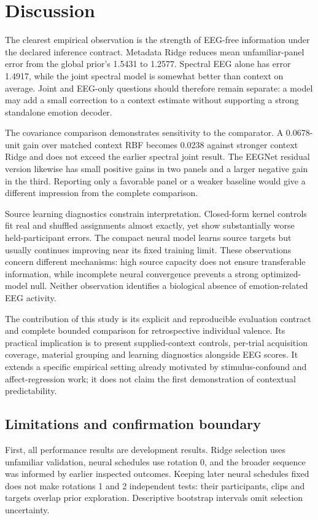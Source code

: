 \documentclass[conference]{IEEEtran}
\begin{document}
\section{Discussion}
The clearest empirical observation is the strength of EEG-free information under the declared inference contract. Metadata Ridge reduces mean unfamiliar-panel error from the global prior's 1.5431 to 1.2577. Spectral EEG alone has error 1.4917, while the joint spectral model is somewhat better than context on average. Joint and EEG-only questions should therefore remain separate: a model may add a small correction to a context estimate without supporting a strong standalone emotion decoder.

The covariance comparison demonstrates sensitivity to the comparator. A 0.0678-unit gain over matched context RBF becomes 0.0238 against stronger context Ridge and does not exceed the earlier spectral joint result. The EEGNet residual version likewise has small positive gains in two panels and a larger negative gain in the third. Reporting only a favorable panel or a weaker baseline would give a different impression from the complete comparison.

Source learning diagnostics constrain interpretation. Closed-form kernel controls fit real and shuffled assignments almost exactly, yet show substantially worse held-participant errors. The compact neural model learns source targets but usually continues improving near its fixed training limit. These observations concern different mechanisms: high source capacity does not ensure transferable information, while incomplete neural convergence prevents a strong optimized-model null. Neither observation identifies a biological absence of emotion-related EEG activity.

The contribution of this study is its explicit and reproducible evaluation contract and complete bounded comparison for retrospective individual valence. Its practical implication is to present supplied-context controls, per-trial acquisition coverage, material grouping and learning diagnostics alongside EEG scores. It extends a specific empirical setting already motivated by stimulus-confound and affect-regression work; it does not claim the first demonstration of contextual predictability.

\subsection{Limitations and confirmation boundary}
First, all performance results are development results. Ridge selection uses unfamiliar validation, neural schedules use rotation 0, and the broader sequence was informed by earlier inspected outcomes. Keeping later neural schedules fixed does not make rotations 1 and 2 independent tests: their participants, clips and targets overlap prior exploration. Descriptive bootstrap intervals omit selection uncertainty.
\end{document}
